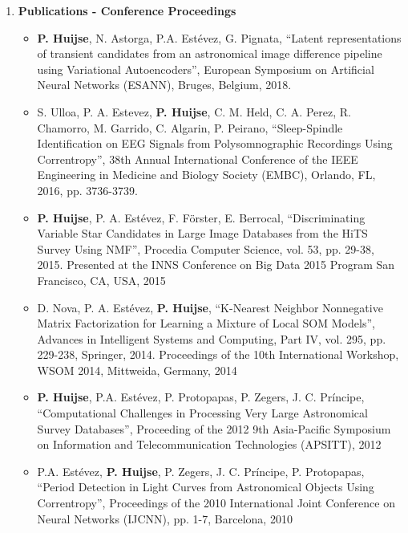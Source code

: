\documentclass[letterpaper,11pt]{article}
\newcommand{\compactlist}{\setlength{\parskip}{0pt} \setlength{\leftskip}{2em}}
\begin{document}
\begin{enumerate}[I]
    \item \textbf{Publications - Conference Proceedings}

	\begin{itemize}  \compactlist{}
	    \item \textbf{P. Huijse}, N. Astorga, P.A. Est\'evez, G. Pignata, ``Latent representations of transient candidates from an astronomical image difference pipeline using Variational Autoencoders'', European Symposium on Artificial Neural Networks (ESANN), Bruges, Belgium, 2018.
        \item S. Ulloa, P. A. Estevez, \textbf{P. Huijse}, C. M. Held, C. A. Perez, R. Chamorro, M. Garrido, C. Algarin, P. Peirano, ``Sleep-Spindle Identification on EEG Signals from Polysomnographic Recordings Using Correntropy'', 38th Annual International Conference of the IEEE Engineering in Medicine and Biology Society (EMBC), Orlando, FL, 2016, pp. 3736-3739.
        \item \textbf{P. Huijse}, P. A. Estévez, F. Förster, E. Berrocal, ``Discriminating Variable Star Candidates in Large Image Databases from the HiTS Survey Using NMF'', Procedia Computer Science, vol. 53, pp. 29-38, 2015. Presented at the INNS Conference on Big Data 2015 Program San Francisco, CA, USA, 2015
        \item D. Nova, P. A. Estévez, \textbf{P. Huijse}, ``K-Nearest Neighbor Nonnegative Matrix Factorization for Learning a Mixture of Local SOM Models'', Advances in Intelligent Systems and Computing, Part IV, vol. 295, pp. 229-238, Springer, 2014. Proceedings of the 10th International Workshop, WSOM 2014, Mittweida, Germany,  2014
        \item \textbf{P. Huijse}, P.A. Estévez, P. Protopapas, P. Zegers, J. C. Príncipe,  ``Computational Challenges in Processing Very Large Astronomical Survey Databases'', Proceeding of the 2012 9th Asia-Pacific Symposium on Information and Telecommunication Technologies (APSITT), 2012
        \item P.A. Estévez, \textbf{P. Huijse}, P. Zegers, J. C. Príncipe, P. Protopapas, ``Period Detection in Light Curves from Astronomical Objects Using Correntropy'', Proceedings of the 2010 International Joint Conference on Neural Networks (IJCNN), pp. 1-7, Barcelona,  2010
	\end{itemize}


\end{enumerate}
\end{document}
